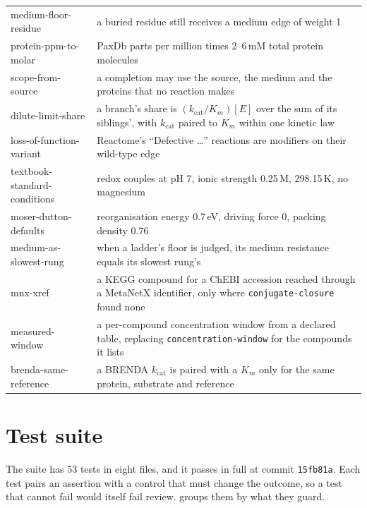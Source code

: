 {\begin{longtable}{@{}>{\raggedright\ttfamily}p{5.3cm}>{\raggedright\arraybackslash}p{10.2cm}@{}}
medium-floor-residue & a buried residue still receives a medium edge of weight 1 \\
protein-ppm-to-molar & PaxDb parts per million times 2--6\,mM total protein molecules \\
scope-from-source & a completion may use the source, the medium and the proteins that no reaction makes \\
dilute-limit-share & a branch's share is $(k_{\mathrm{cat}}/K_m)[E]$ over the sum of its siblings', with $k_{\mathrm{cat}}$ paired to $K_m$ within one kinetic law \\
loss-of-function-variant & Reactome's ``Defective \dots'' reactions are modifiers on their wild-type edge \\
textbook-standard-conditions & redox couples at pH 7, ionic strength 0.25\,M, 298.15\,K, no magnesium \\
moser-dutton-defaults & reorganisation energy 0.7\,eV, driving force 0, packing density 0.76 \\
medium-as-slowest-rung & when a ladder's floor is judged, its medium resistance equals its slowest rung's \\
mnx-xref & a KEGG compound for a ChEBI accession reached through a MetaNetX identifier, only where \texttt{conjugate-closure} found none \\
measured-window & a per-compound concentration window from a declared table, replacing \texttt{concentration-window} for the compounds it lists \\
brenda-same-reference & a BRENDA $k_{\mathrm{cat}}$ is paired with a $K_m$ only for the same protein, substrate and reference \\
\end{longtable}}

\section{Test suite}
\label{app:tests}

The suite has 53 tests in eight files, and it passes in full at commit \texttt{15fb81a}.
Each test pairs an assertion with a control that must change the outcome, so a test that cannot fail would itself fail review.
 groups them by what they guard.


